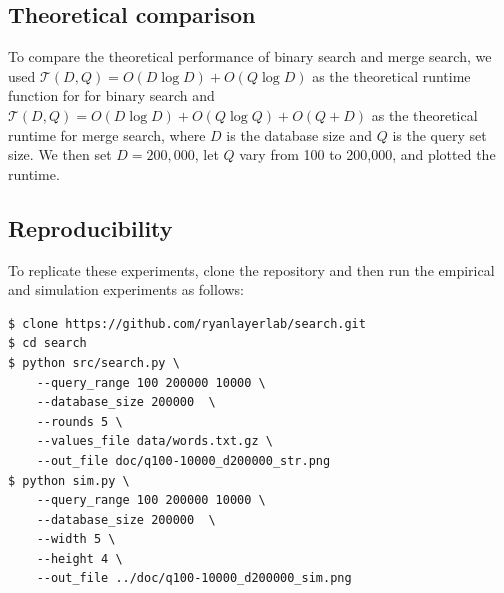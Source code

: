 \documentclass[11pt, letterpaper]{article}
\begin{document}
\subsection{Theoretical comparison}

To compare the theoretical performance of binary search and merge search,
we used $\mathcal{T}(D,Q)=O(D \log D) + O(Q \log D)$ as the theoretical
runtime function for for binary search and $\mathcal{T}(D,Q)=O(D \log D) +
O(Q \log Q) + O(Q + D)$ as the theoretical runtime for merge search, where
$D$ is the database size and $Q$ is the query set size. We then set $D=200,000$, let $Q$ vary from 100 to 200,000, and plotted the runtime.


\subsection{Reproducibility}

To replicate these experiments, clone the repository and then run the
empirical and simulation experiments as follows:
\begin{verbatim}
$ clone https://github.com/ryanlayerlab/search.git
$ cd search
$ python src/search.py \
    --query_range 100 200000 10000 \
    --database_size 200000  \
    --rounds 5 \
    --values_file data/words.txt.gz \
    --out_file doc/q100-10000_d200000_str.png
$ python sim.py \
    --query_range 100 200000 10000 \
    --database_size 200000  \
    --width 5 \
    --height 4 \
    --out_file ../doc/q100-10000_d200000_sim.png 
\end{verbatim}
\end{document}
